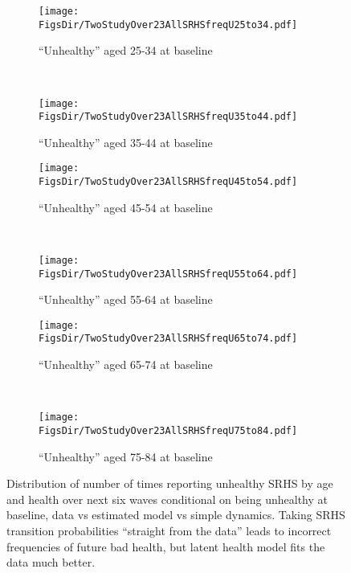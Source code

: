 \documentclass[12pt,pdftex,letterpaper]{article}
\newcommand{\RootDir}{..}
\newcommand{\FigsDir}{\RootDir/Figures}
\begin{document}
\begin{figure}
	\centering
	\begin{subfigure}[b]{0.48\textwidth}
		\texttt{[image: \\FigsDir/TwoStudyOver23AllSRHSfreqU25to34.pdf]}
		\caption{``Unhealthy'' aged 25-34 at baseline}\label{fig:SRHSfreqU25to34}
	\end{subfigure}
	~
	\begin{subfigure}[b]{0.48\textwidth}
		\texttt{[image: \\FigsDir/TwoStudyOver23AllSRHSfreqU35to44.pdf]}
		\caption{``Unhealthy'' aged 35-44 at baseline}\label{fig:SRHSfreqU35to44}
	\end{subfigure}
	
	\begin{subfigure}[b]{0.48\textwidth}
		\texttt{[image: \\FigsDir/TwoStudyOver23AllSRHSfreqU45to54.pdf]}
		\caption{``Unhealthy'' aged 45-54 at baseline}\label{fig:SRHSfreqU45to54}
	\end{subfigure}
	~
	\begin{subfigure}[b]{0.48\textwidth}
		\texttt{[image: \\FigsDir/TwoStudyOver23AllSRHSfreqU55to64.pdf]}
		\caption{``Unhealthy'' aged 55-64 at baseline}\label{fig:SRHSfreqU55to64}
	\end{subfigure}
	
	
	\begin{subfigure}[b]{0.48\textwidth}
		\texttt{[image: \\FigsDir/TwoStudyOver23AllSRHSfreqU65to74.pdf]}
		\caption{``Unhealthy'' aged 65-74 at baseline}\label{fig:SRHSfreqU65to74}
	\end{subfigure}
	~
	\begin{subfigure}[b]{0.48\textwidth}
		\texttt{[image: \\FigsDir/TwoStudyOver23AllSRHSfreqU75to84.pdf]}
		\caption{``Unhealthy'' aged 75-84 at baseline}\label{fig:SRHSfreqU75to84}
	\end{subfigure}
	\caption{Distribution of number of times reporting unhealthy SRHS by age and health over next six waves conditional on being unhealthy at baseline, data vs estimated model vs simple dynamics. Taking SRHS transition probabilities ``straight from the data'' leads to incorrect frequencies of future bad health, but latent health model fits the data much better. }\label{fig:SRHSfreqUTwoStudy}
\end{figure}
\end{document}
